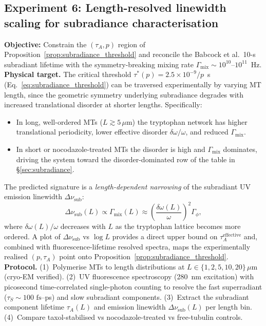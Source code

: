 \documentclass[twocolumn,10pt]{article}
\newcommand{\fs}{\text{~fs}}
\begin{document}
\subsection{Experiment 6: Length-resolved linewidth scaling for subradiance
characterisation}
\label{sec:exp6}
\textbf{Objective:} Constrain the $(\tau_A, p)$ region of
Proposition~\ref{prop:subradiance_threshold} and reconcile the Babcock
et al.\ 10-s subradiant lifetime with the symmetry-breaking mixing rate
$\Gamma_{\text{mix}} \sim 10^{10}\text{--}10^{11}$~Hz.
\textbf{Physical target.} The critical threshold
$\tau^*(p) = 2.5\times 10^{-9}/p$~s (Eq.~\ref{eq:subradiance_threshold})
can be traversed experimentally by varying MT length, since the geometric
symmetry underlying subradiance degrades with increased translational
disorder at shorter lengths. Specifically:
\begin{itemize}
\item In long, well-ordered MTs ($L \gtrsim 5\,\mu$m) the tryptophan
network has higher translational periodicity, lower effective disorder
$\delta\omega/\omega$, and reduced $\Gamma_{\text{mix}}$.
\item In short or nocodazole-treated MTs the disorder is high and
$\Gamma_{\text{mix}}$ dominates, driving the system toward the
disorder-dominated row of the table in \S\ref{sec:subradiance}.
\end{itemize}
The predicted signature is a \emph{length-dependent narrowing} of the
subradiant UV emission linewidth $\Delta\nu_{\text{sub}}$:
\begin{equation}
\Delta\nu_{\text{sub}}(L) \propto
\Gamma_{\text{mix}}(L) \approx
\left(\frac{\delta\omega(L)}{\omega}\right)^2 \Gamma_\phi,
\end{equation}
where $\delta\omega(L)/\omega$ decreases with $L$ as the tryptophan lattice
becomes more ordered. A plot of $\Delta\nu_{\text{sub}}$ vs $\log L$
provides a direct upper bound on $\tau_A^{\text{effective}}$ and,
combined with fluorescence-lifetime resolved spectra, maps the
experimentally realised $(p, \tau_A)$ point onto
Proposition~\ref{prop:subradiance_threshold}.
\textbf{Protocol.}
(1)~Polymerise MTs to length distributions at
$L \in \{1, 2, 5, 10, 20\}\,\mu$m (cryo-EM verified).
(2)~UV fluorescence spectroscopy (280~nm excitation) with picosecond
time-correlated single-photon counting to resolve the fast superradiant
($\tau_S \sim 100\fs$--ps) and slow subradiant components.
(3)~Extract the subradiant component lifetime $\tau_A(L)$ and emission
linewidth $\Delta\nu_{\text{sub}}(L)$ per length bin.
(4)~Compare taxol-stabilised vs nocodazole-treated vs free-tubulin controls.
\end{document}
